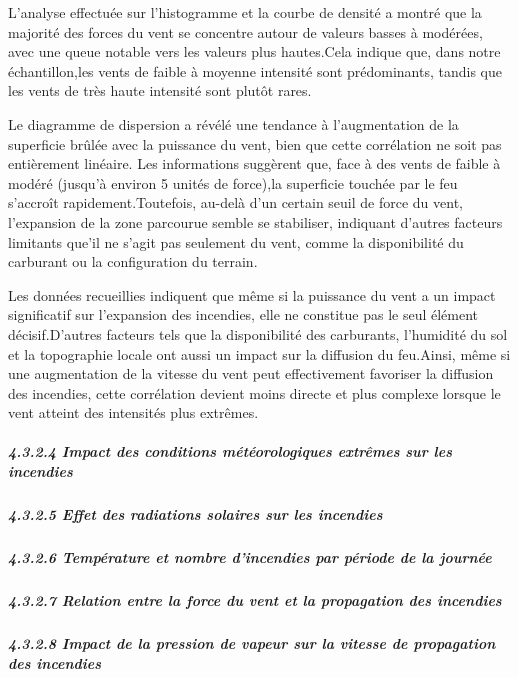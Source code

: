 \documentclass[
]{article}
\begin{document}
L'analyse effectuée sur l'histogramme et la courbe de densité a montré
que la majorité des forces du vent se concentre autour de valeurs basses
à modérées, avec une queue notable vers les valeurs plus hautes.Cela
indique que, dans notre échantillon,les vents de faible à moyenne
intensité sont prédominants, tandis que les vents de très haute
intensité sont plutôt rares.

Le diagramme de dispersion a révélé une tendance à l'augmentation de la
superficie brûlée avec la puissance du vent, bien que cette corrélation
ne soit pas entièrement linéaire. Les informations suggèrent que, face à
des vents de faible à modéré (jusqu'à environ 5 unités de force),la
superficie touchée par le feu s'accroît rapidement.Toutefois, au-delà
d'un certain seuil de force du vent, l'expansion de la zone parcourue
semble se stabiliser, indiquant d'autres facteurs limitants que'il ne
s'agit pas seulement du vent, comme la disponibilité du carburant ou la
configuration du terrain.

Les données recueillies indiquent que même si la puissance du vent a un
impact significatif sur l'expansion des incendies, elle ne constitue pas
le seul élément décisif.D'autres facteurs tels que la disponibilité des
carburants, l'humidité du sol et la topographie locale ont aussi un
impact sur la diffusion du feu.Ainsi, même si une augmentation de la
vitesse du vent peut effectivement favoriser la diffusion des incendies,
cette corrélation devient moins directe et plus complexe lorsque le vent
atteint des intensités plus extrêmes.

\subparagraph{4.3.2.4 Impact des conditions météorologiques extrêmes sur
les
incendies}\label{impact-des-conditions-muxe9tuxe9orologiques-extruxeames-sur-les-incendies}

\subparagraph{4.3.2.5 Effet des radiations solaires sur les
incendies}\label{effet-des-radiations-solaires-sur-les-incendies}

\subparagraph{4.3.2.6 Température et nombre d'incendies par période de
la
journée}\label{tempuxe9rature-et-nombre-dincendies-par-puxe9riode-de-la-journuxe9e}

\subparagraph{4.3.2.7 Relation entre la force du vent et la propagation
des
incendies}\label{relation-entre-la-force-du-vent-et-la-propagation-des-incendies}

\subparagraph{4.3.2.8 Impact de la pression de vapeur sur la vitesse de
propagation des
incendies}\label{impact-de-la-pression-de-vapeur-sur-la-vitesse-de-propagation-des-incendies}
\end{document}

